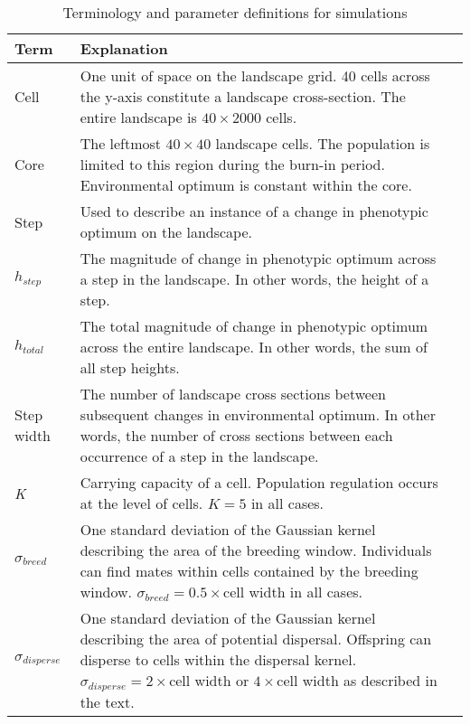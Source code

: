 \begin{table}[h]
\centering \footnotesize
\caption{Terminology and parameter definitions for simulations}
\label{tab:params}
\begin{tabular}{lp{}l}
Term		& Explanation  \\ \hline \hline
Cell		& One unit of space on the landscape grid. 40 cells across the y-axis constitute a landscape cross-section. The entire landscape is $40\times2000$ cells.			\\ \hline
Core		& The leftmost $40\times40$ landscape cells. The population is limited to this region during the burn-in period. Environmental optimum is constant within the core.	\\ \hline
Step		& Used to describe an instance of a change in phenotypic optimum on the landscape.															\\ \hline
$h_{step}$ & The magnitude of change in phenotypic optimum across a step in the landscape. In other words, the height of a step.									\\ \hline
$h_{total}$ & The total magnitude of change in phenotypic optimum across the entire landscape. In other words, the sum of all step heights.							\\ \hline
Step width	& The number of landscape cross sections between subsequent changes in environmental optimum. In other words, the number of cross sections between each occurrence of a step in the landscape.	\\ \hline
\emph{K}	& Carrying capacity of a cell. Population regulation occurs at the level of cells. $K = 5$ in all cases.													\\ \hline
$\sigma_{breed}$ & One standard deviation of the Gaussian kernel describing the area of the breeding window. Individuals can find mates within cells contained by the breeding window. $\sigma_{breed} = 0.5\times$cell width in all cases. \\ \hline
$\sigma_{disperse}$ & One standard deviation of the Gaussian kernel describing the area of potential dispersal. Offspring can disperse to cells within the dispersal kernel. $\sigma_{disperse} = 2\times$cell width or $4\times$cell width as described in the text.                                          
\end{tabular}
\end{table}




